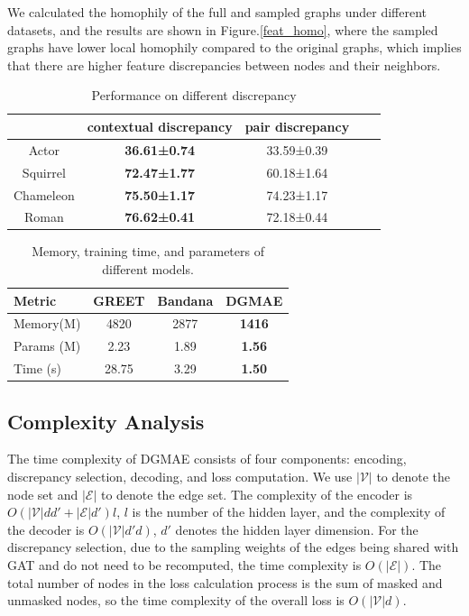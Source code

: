 \documentclass[sigconf]{acmart}
\begin{document}
We calculated the homophily of the full and sampled graphs under different datasets, and the results are shown in Figure.\ref{feat_homo}, where the sampled graphs have lower local homophily compared to the original graphs, which implies that there are higher feature discrepancies between nodes and their neighbors.


\begin{table}[h]
\caption{Performance on different discrepancy}
\centering
\begin{tabular}{c|cccc}
\hline
 & contextual discrepancy & pair discrepancy & & \\
\hline
Actor & \textbf{36.61±0.74} & 33.59±0.39 & & \\
Squirrel & \textbf{72.47±1.77} & 60.18±1.64 & & \\
Chameleon & \textbf{75.50±1.17} & 74.23±1.17 & & \\
Roman & \textbf{76.62±0.41} & 72.18±0.44 & & \\
\hline
\end{tabular}
\label{tab:discrepancy-transposed}
\end{table}

\begin{table}
\caption{Memory, training time, and parameters of different models.}
\begin{tabular}{l|c c c}
\toprule
\textbf{Metric} & GREET  & Bandana &  \textbf{DGMAE}\\
\midrule
Memory(M) & 4820&	2877&	\textbf{1416} \\
Params (M) & 2.23 &  1.89 & \textbf{1.56} \\
Time (s) & 28.75 & 3.29 & \textbf{1.50} \\
\bottomrule
\end{tabular}
\label{complexity}
\end{table}

\subsection{Complexity Analysis}
The time complexity of DGMAE consists of four components:  encoding, discrepancy selection, decoding, and loss computation. We use $\mathcal{|V|}$ to denote the node set and $\mathcal{|E|}$ to denote the edge set.  The complexity of the encoder is $O(|\mathcal{V}|dd' + |\mathcal{E}|d')l$, $l$ is the number of the hidden layer, and the complexity of the decoder is $O(|\mathcal{V}|d'd)$, $d'$ denotes the hidden layer dimension. For the discrepancy selection,  due to the sampling weights of the edges being shared with GAT and do not need to be recomputed, the time complexity is $O(|\mathcal{E}|)$. The total number of nodes in the loss calculation process is the sum of masked and unmasked nodes, so the time complexity of the overall loss is $O(|\mathcal{V}|d)$.
\end{document}
